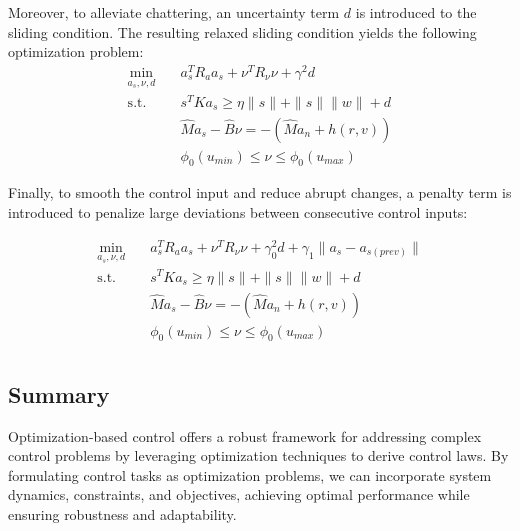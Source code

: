     Moreover, to alleviate chattering, an uncertainty 
    term $d$ is introduced to the sliding condition. The resulting relaxed 
    sliding condition yields the following optimization problem:
    \begin{equation}
    \begin{aligned}
    \min_{a_s, \nu, d} \quad & a_s^T R_a a_s + \nu^T R_\nu \nu + \gamma^2 d\\
    \textrm{s.t.} \quad & s^TKa_s \geq \eta \|s\| + \|s\|\|w\| + d\\
    &\hat Ma_s - \hat B\nu = -(\hat{M}a_n + h(r, v)) \\
    &\phi_0(u_{min}) \leq \nu \leq \phi_0(u_{max})
    \end{aligned}
    \end{equation}

    Finally, to smooth the control input and reduce abrupt changes, 
    a penalty term is introduced to penalize large deviations between 
    consecutive control inputs:

    \begin{equation}
    \begin{aligned}
    \min_{a_s, \nu, d} \quad & a_s^T R_a a_s + \nu^T R_\nu \nu +
    \gamma_0^2 d + \gamma_1 \|a_s - a_{s (prev)}\|\\
    \textrm{s.t.} \quad & s^TKa_s \geq \eta \|s\| + \|s\|\|w\| + d\\
    &\hat Ma_s - \hat B\nu = -(\hat{M}a_n + h(r, v)) \\
    &\phi_0(u_{min}) \leq \nu \leq \phi_0(u_{max}) \\
    \end{aligned}
    \label{eq::final_opt}
    \end{equation}

    \subsection{Summary}

    Optimization-based control offers a robust framework for addressing complex control 
    problems by leveraging optimization techniques to derive control laws. 
    By formulating control tasks as optimization problems, we can incorporate system 
    dynamics, constraints, and objectives, achieving optimal performance while ensuring 
    robustness and adaptability.
